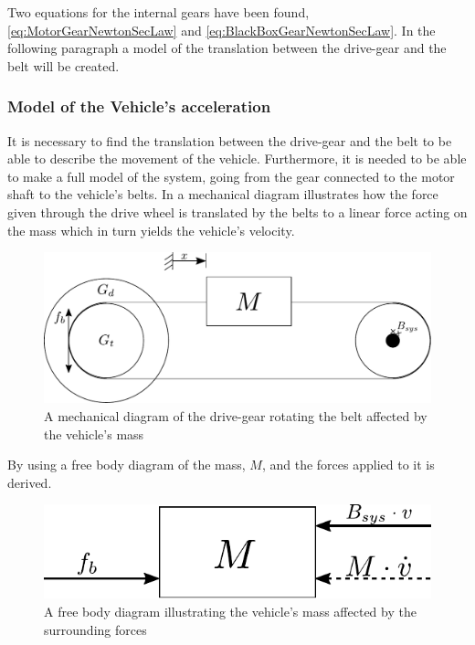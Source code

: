 Two equations for the internal gears have been found, \eqref{eq:MotorGearNewtonSecLaw} and \eqref{eq:BlackBoxGearNewtonSecLaw}. In the following paragraph a model of the translation between the drive-gear and the belt will be created.

\subsubsection{Model of the Vehicle's acceleration}\label{BeltModel}
It is necessary to find the translation between the drive-gear and the belt to be able to describe the movement of the vehicle. Furthermore, it is needed to be able to make a full model of the system, going from the gear connected to the motor shaft to the vehicle's belts. In  a mechanical diagram illustrates how the force given through the drive wheel is translated by the belts to a linear force acting on the mass which in turn yields the vehicle's velocity.

\begin{figure}[H]
	\centering
	\includegraphics[scale=0.8]{figures/mechanicalDrawingBelt.pdf}
	\caption{A mechanical diagram of the drive-gear rotating the belt affected by the vehicle's mass}
	\label{fig:BeltMechanicalDiagram}
\end{figure}

By using  a free body diagram of the mass, $M$, and the forces applied to it is derived.

\begin{figure}[H]
	\centering
	\includegraphics[scale=.8]{figures/freeBodyBelt.pdf}
	\caption{A free body diagram illustrating the vehicle's mass affected by the surrounding forces}
	\label{fig:BeltFreeBodyDiagram}
\end{figure}

